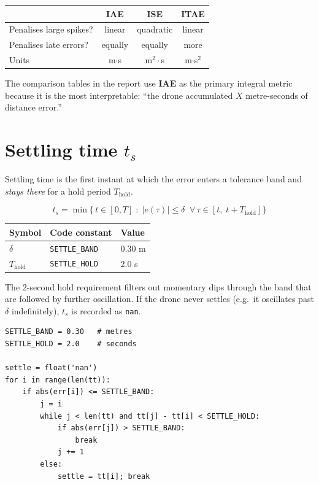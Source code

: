\documentclass[11pt,a4paper]{article}
\begin{document}
\begin{center}
  \begin{tabular}{lccc}
    \toprule
    & IAE & ISE & ITAE \\
    \midrule
    Penalises large spikes? & linear & quadratic & linear \\
    Penalises late errors?  & equally & equally & more\\
    Units                   & m$\cdot$s & m$^2\cdot$s & m$\cdot$s$^2$ \\
    \bottomrule
  \end{tabular}
\end{center}

The comparison tables in the report use \textbf{IAE} as the primary integral
metric because it is the most interpretable: ``the drone accumulated $X$
metre-seconds of distance error.''

\section{Settling time \boldmath$t_s$}

Settling time is the first instant at which the error enters a tolerance band
and \emph{stays there} for a hold period $T_{\mathrm{hold}}$.

\[
  \boxed{t_s = \min\bigl\{\, t \in [0,T] \;:\; |e(\tau)| \le \delta \;\; \forall\, \tau \in [t,\; t + T_{\mathrm{hold}}] \bigr\}}
\]

\begin{center}
  \begin{tabular}{lll}
    \toprule
    Symbol & Code constant & Value \\
    \midrule
    $\delta$ & \texttt{SETTLE\_BAND} & 0.30 m \\
    $T_{\mathrm{hold}}$ & \texttt{SETTLE\_HOLD} & 2.0 s \\
    \bottomrule
  \end{tabular}
\end{center}

The 2-second hold requirement filters out momentary dips through the band
that are followed by further oscillation.
If the drone never settles (e.g.\ it oscillates past $\delta$ indefinitely),
$t_s$ is recorded as \texttt{nan}.

\begin{lstlisting}
SETTLE_BAND = 0.30   # metres
SETTLE_HOLD = 2.0    # seconds

settle = float('nan')
for i in range(len(tt)):
    if abs(err[i]) <= SETTLE_BAND:
        j = i
        while j < len(tt) and tt[j] - tt[i] < SETTLE_HOLD:
            if abs(err[j]) > SETTLE_BAND:
                break
            j += 1
        else:
            settle = tt[i]; break
\end{lstlisting}
\end{document}

